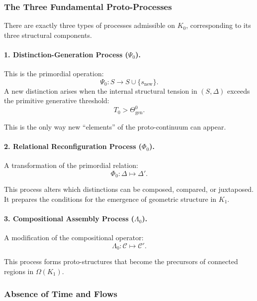 \subsubsection{The Three Fundamental Proto-Processes}

There are exactly three types of processes admissible on $K_0$,
corresponding to its three structural components.

\paragraph{1. Distinction-Generation Process (\texorpdfstring{$\Psi_0$}{\Psi_0}).}

This is the primordial operation:
\[
\Psi_0: S \to S \cup \{s_{\mathrm{new}}\}.
\]
A new distinction arises when the internal structural tension in
$(S,\Delta)$ exceeds the primitive generative threshold:
\[
T_0 > \Theta_{\mathrm{gen}}^0.
\]

This is the only way new ``elements'' of the proto-continuum can appear.

\paragraph{2. Relational Reconfiguration Process (\texorpdfstring{$\Phi_0$}{\Phi_0}).}

A transformation of the primordial relation:
\[
\Phi_0: \Delta \mapsto \Delta'.
\]

This process alters which distinctions can be composed, compared, or
juxtaposed. It prepares the conditions for the emergence of geometric
structure in $K_1$.

\paragraph{3. Compositional Assembly Process (\texorpdfstring{$\Lambda_0$}{\Lambda_0}).}

A modification of the compositional operator:
\[
\Lambda_0: \mathcal{C} \mapsto \mathcal{C}'.
\]

This process forms proto-structures that become the precursors of connected
regions in $\Omega(K_1)$.

\subsubsection{Absence of Time and Flows}

